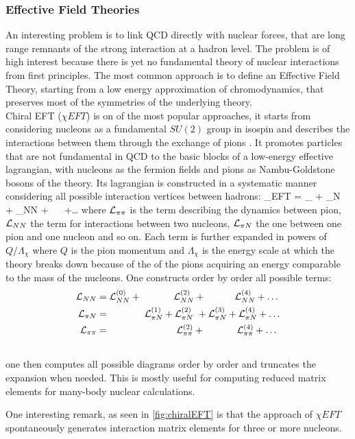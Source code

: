 \subsubsection{Effective Field Theories}
An interesting problem is to link QCD directly with nuclear forces, that are long range remnants of the strong interaction at a hadron level. The problem is of high interest because there is yet no fundamental theory of nuclear interactions from first principles. The most common approach is to define an Effective Field Theory, starting from a low energy approximation of chromodynamics, that preserves most of the symmetries of the underlying theory. \\
Chiral EFT ($\chi EFT$) is on of the most popular approaches, it starts from considering nucleons as a fundamental $SU(2)$ group in isospin and describes the interactions between them through the exchange of pions \cite{machleidt_chiral_2016}. It promotes particles that are not fundamental in QCD to the basic blocks of a low-energy effective lagrangian, with nucleons as the fermion fields and pions as Nambu-Goldstone bosons of the theory. Its lagrangian is constructed in a systematic manner considering all possible interaction vertices between hadrons:
\beq
    \Lagr_{\chi EFT} = \Lagr_{\pi\pi} +  \Lagr_{\pi N} + \Lagr_{NN} + ~ ~+\dots
\eeq 
where $\mathcal{L}_{\pi\pi}$ is the term describing the dynamics between pion, $\mathcal{L}_{NN}$ the term for interactions between two nucleons, $\mathcal{L}_{\pi N}$ the one between one pion and one nucleon and so on. Each term is further expanded in powers of $Q/\Lambda_\chi$ where $Q$ is the pion momentum and $\Lambda_\chi$ is the energy scale at which the theory breaks down because of the of the pions acquiring an energy comparable to the mass of the nucleons. One constructs order by order all possible terms:
\begin{align}
    \mathcal{L}_{NN} &= \mathcal{L}_{NN}^{(0)} + ~~~~~~~~~~  \mathcal{L}_{NN}^{(2)} + ~~~~~~~~~  \mathcal{L}_{NN}^{(4)} + \dots\\\nonumber
    \mathcal{L}_{\pi N} &= ~~~~~~~~~~~ \mathcal{L}_{\pi N}^{(1)} + \mathcal{L}_{\pi N}^{(2)} ~+  \mathcal{L}_{\pi N}^{(3)} + \mathcal{L}_{\pi N}^{(4)} + \dots  \\\nonumber
    \mathcal{L}_{\pi \pi} &= ~~~~~~~~~~~~~~~~~~~~~ \mathcal{L}_{\pi \pi}^{(2)} +  ~~~~~~~~~~  \mathcal{L}_{\pi \pi}^{(4)} + \dots  \\\nonumber
\end{align} 
one then computes all possible diagrams order by order and truncates the expansion when needed. This is mostly useful for computing reduced matrix elements for many-body nuclear calculations. 

One interesting remark, as seen in \cref{fig:chiralEFT} is that the approach of $\chi EFT$ spontaneously generates interaction matrix elements for three or more nucleons. 